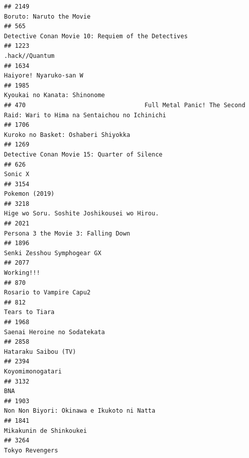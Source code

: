 \documentclass[
]{article}
\begin{document}
\begin{verbatim}
## 2149                                                                                  Boruto: Naruto the Movie
## 565                                                        Detective Conan Movie 10: Requiem of the Detectives
## 1223                                                                                            .hack//Quantum
## 1634                                                                                    Haiyore! Nyaruko-san W
## 1985                                                                              Kyoukai no Kanata: Shinonome
## 470                                 Full Metal Panic! The Second Raid: Wari to Hima na Sentaichou no Ichinichi
## 1706                                                                       Kuroko no Basket: Oshaberi Shiyokka
## 1269                                                              Detective Conan Movie 15: Quarter of Silence
## 626                                                                                                    Sonic X
## 3154                                                                                            Pokemon (2019)
## 3218                                                               Hige wo Soru. Soshite Joshikousei wo Hirou.
## 2021                                                                       Persona 3 the Movie 3: Falling Down
## 1896                                                                               Senki Zesshou Symphogear GX
## 2077                                                                                                Working!!!
## 870                                                                                   Rosario to Vampire Capu2
## 812                                                                                             Tears to Tiara
## 1968                                                                              Saenai Heroine no Sodatekata
## 2858                                                                                      Hataraku Saibou (TV)
## 2394                                                                                          Koyomimonogatari
## 3132                                                                                                       BNA
## 1903                                                                Non Non Biyori: Okinawa e Ikukoto ni Natta
## 1841                                                                                   Mikakunin de Shinkoukei
## 3264                                                                                           Tokyo Revengers

\end{verbatim}
\end{document}
